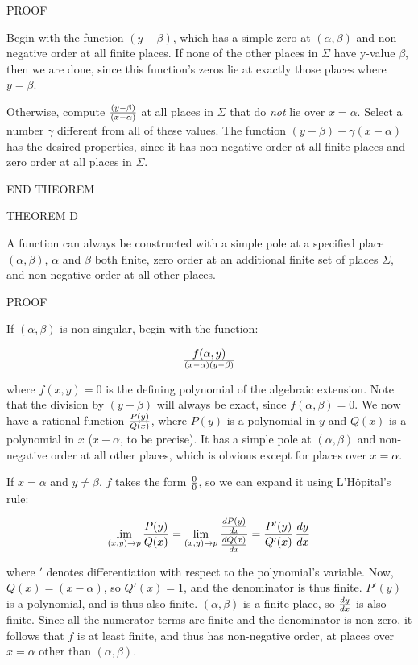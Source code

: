 PROOF

Begin with the function $(y-\beta)$, which has a simple zero at
$(\alpha, \beta)$ and non-negative order at all finite places.  If
none of the other places in $\Sigma$ have y-value $\beta$, then we are
done, since this function's zeros lie at exactly those places where $y
= \beta$.

Otherwise, compute $(y-\beta)\over(x-\alpha)$ at all places in $\Sigma$
that do {\it not} lie over $x = \alpha$.  Select a number
$\gamma$ different from all of these values.  The function
$(y-\beta) - \gamma (x-\alpha)$ has the desired properties, since
it has non-negative order at all finite places and zero order at
all places in $\Sigma$.

END THEOREM

THEOREM D

A function can always be constructed with a simple pole at a specified
place $(\alpha, \beta)$, $\alpha$ and $\beta$ both finite, zero order
at an additional finite set of places $\Sigma$, and non-negative order
at all other places.

PROOF

If $(\alpha, \beta)$ is non-singular, begin with the function:

$$f(\alpha,y)\over(x-\alpha)(y-\beta)$$

where $f(x,y)=0$ is the defining polynomial of the algebraic extension.
Note that the division by $(y-\beta)$ will always be exact, since
$f(\alpha, \beta)=0$.  We now have a rational function
$P(y)\over Q(x)$, where $P(y)$ is a polynomial in $y$ and $Q(x)$ is a
polynomial in $x$ ($x-\alpha$, to be precise).  It has a simple pole at
$(\alpha, \beta)$ and non-negative order at all other places, which
is obvious except for places over $x=\alpha$.

If $x=\alpha$ and $y\ne\beta$, $f$ takes the form $0\over0$, so we can
expand it using L'H\^opital's rule:

$$\lim_{(x,y)\to p} {{P(y)}\over{Q(x)}}
  = \lim_{{(x,y)\to p}} {{{dP(y)}\over{dx}}\over{{dQ(x)}\over{dx}}}
  = {{P'(y)}\over{Q'(x)}} \, {{dy}\over{dx}} $$

where $'$ denotes differentiation with respect to the polynomial's
variable.  Now, $Q(x)=(x-\alpha)$, so $Q'(x)=1$, and the denominator
is thus finite.  $P'(y)$ is a polynomial, and is thus also finite.
$(\alpha, \beta)$ is a finite place, so ${dy}\over{dx}$ is also
finite.  Since all the numerator terms are finite and the denominator
is non-zero, it follows that $f$ is at least finite, and thus has
non-negative order, at places over $x=\alpha$ other than $(\alpha,
\beta)$.

